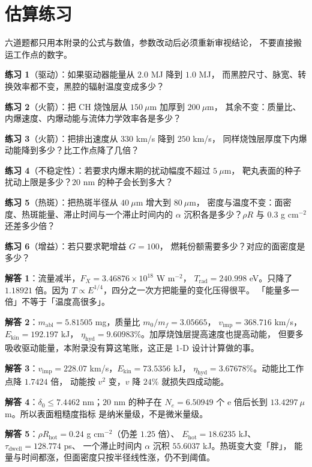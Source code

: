 \section{估算练习}
\label{sec:app-ai-problems}

六道题都只用本附录的公式与数值，参数改动后必须重新审视结论，
不要直接搬运工作点的数字。

\textbf{练习 1}（驱动）：如果驱动器能量从 $2.0$ MJ 降到 $1.0$ MJ，
而黑腔尺寸、脉宽、转换效率都不变，黑腔的辐射温度变成多少？

\textbf{练习 2}（火箭）：把 CH 烧蚀层从 $150\ \mu$m 加厚到 $200\ \mu$m，
其余不变：质量比、内爆速度、内爆动能与流体力学效率各是多少？

\textbf{练习 3}（火箭）：把排出速度从 $330$ km/s 降到 $250$ km/s，
同样烧蚀层厚度下内爆动能降到多少？比工作点降了几倍？

\textbf{练习 4}（不稳定性）：若要求内爆末期的扰动幅度不超过 $5\ \mu$m，
靶丸表面的种子扰动上限是多少？$20$ nm 的种子会长到多大？

\textbf{练习 5}（热斑）：把热斑半径从 $40\ \mu$m 增大到 $80\ \mu$m，
密度与温度不变：面密度、热斑能量、滞止时间与一个滞止时间内的
$\alpha$ 沉积各是多少？$\rho R$ 与 $0.3$ g cm$^{-2}$ 还差多少倍？

\textbf{练习 6}（增益）：若只要求靶增益 $G = 100$，
燃耗份额需要多少？对应的面密度是多少？

\textbf{解答 1}：流量减半，$F_X = 3.46876\times10^{18}$ W m$^{-2}$，
$T_{\mathrm{rad}} = 240.998$ eV。只降了 $1.18921$ 倍。因为 $T \propto E^{1/4}$，四分之一次方把能量的变化压得很平。
「能量多一倍」不等于「温度高很多」。

\textbf{解答 2}：$m_{\mathrm{abl}} = 5.81505$ mg，质量比 $m_0/m_f = 3.05665$，
$v_{\mathrm{imp}} = 368.716$ km/s，$E_{\mathrm{kin}} = 192.197$ kJ，
$\eta_{\mathrm{hyd}} = 9.60983\%$。加厚烧蚀层提高速度也提高动能，
但要多吸收驱动能量，本附录没有算这笔账，这正是 1-D 设计计算做的事。

\textbf{解答 3}：$v_{\mathrm{imp}} = 228.07$ km/s，$E_{\mathrm{kin}} = 73.5356$ kJ，
$\eta_{\mathrm{hyd}} = 3.67678\%$。动能比工作点降 $1.7424$ 倍，
动能按 $v^2$ 变，$v$ 降 $24\%$ 就损失四成动能。

\textbf{解答 4}：$\delta_0 \le 7.4462$ nm；$20$ nm 的种子在
$N_e = 6.50949$ 个 e 倍后长到 $13.4297\ \mu$m。所以表面粗糙度指标
是纳米量级，不是微米量级。

\textbf{解答 5}：$\rho R_{\mathrm{hot}} = 0.24$ g cm$^{-2}$（仍差 $1.25$ 倍）、
$E_{\mathrm{hot}} = 18.6235$ kJ、$\tau_{\mathrm{dwell}} = 128.774$ ps、
一个滞止时间内 $\alpha$ 沉积 $55.6037$ kJ。热斑变大变「胖」，
能量与时间都涨，但面密度只按半径线性涨，仍不到阈值。

